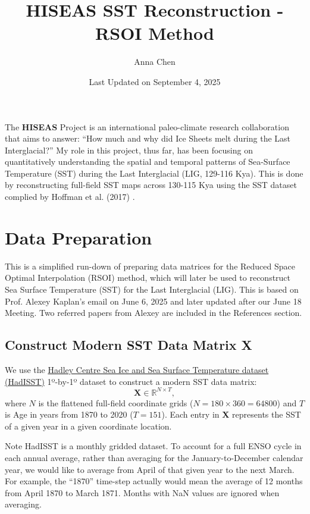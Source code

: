 \documentclass{article}
\title{HISEAS SST Reconstruction - RSOI Method}
\author{Anna Chen}
\date{Last Updated on September 4, 2025}
\begin{document}
\maketitle

The \textbf{HISEAS} Project is an international paleo-climate research collaboration that aims to answer: “How much and why did Ice Sheets melt during the Last Interglacial?” My role in this project, thus far, has been focusing on quantitatively understanding the spatial and temporal patterns of Sea-Surface Temperature (SST) during the Last Interglacial (LIG, 129-116 Kya). This is done by reconstructing full-field SST maps across 130-115 Kya using the  SST dataset complied by Hoffman et al. (2017) \cite{Hoffman2017}.

\section{Data Preparation}

This is a simplified run-down of preparing data matrices for the Reduced Space Optimal Interpolation (RSOI) method, which will later be used to reconstruct Sea Surface Temperature (SST) for the Last Interglacial (LIG). This is based on Prof. Alexey Kaplan's email on June 6, 2025 and later updated after our June 18 Meeting. Two referred papers from Alexey are included in the References section.

\subsection{Construct Modern SST Data Matrix \textbf{X}}

We use the \ul{Hadley Centre Sea Ice and Sea Surface Temperature dataset (HadISST)} 1º-by-1º dataset \cite{HadISST} to construct a modern SST data matrix:
$$\textbf{X} \in \mathbb{R}^{N \times T},$$
where $N$ is the flattened full-field coordinate grids ($N = 180 \times 360 = 64800$) and $T$ is Age in years from 1870 to 2020 ($T=151$). Each entry in \textbf{X} represents the SST of a given year in a given coordinate location.

Note HadISST is a monthly gridded dataset. To account for a full ENSO cycle in each annual average, rather than averaging for the January-to-December calendar year, we would like to average from April of that given year to the next March. For example, the “1870” time-step actually would mean the average of 12 months from April 1870 to March 1871. Months with NaN values are ignored when averaging.
\end{document}
